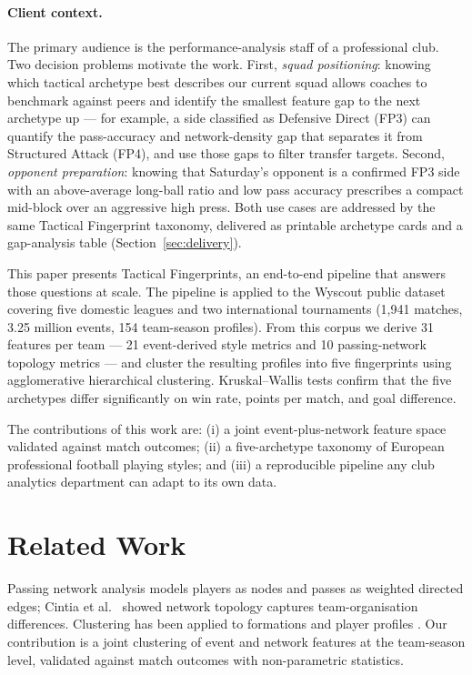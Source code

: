 \documentclass[runningheads]{llncs}
\begin{document}
\paragraph*{Client context.}
The primary audience is the performance-analysis staff of a professional club. Two decision problems motivate the work. First, \textit{squad positioning}: knowing which tactical archetype best describes our current squad allows coaches to benchmark against peers and identify the smallest feature gap to the next archetype up --- for example, a side classified as Defensive Direct (FP3) can quantify the pass-accuracy and network-density gap that separates it from Structured Attack (FP4), and use those gaps to filter transfer targets. Second, \textit{opponent preparation}: knowing that Saturday's opponent is a confirmed FP3 side with an above-average long-ball ratio and low pass accuracy prescribes a compact mid-block over an aggressive high press. Both use cases are addressed by the same Tactical Fingerprint taxonomy, delivered as printable archetype cards and a gap-analysis table (Section~\ref{sec:delivery}).

This paper presents Tactical Fingerprints, an end-to-end pipeline that answers those questions at scale. The pipeline is applied to the Wyscout public dataset covering five domestic leagues and two international tournaments (1,941 matches, 3.25 million events, 154 team-season profiles). From this corpus we derive 31 features per team --- 21 event-derived style metrics and 10 passing-network topology metrics --- and cluster the resulting profiles into five fingerprints using agglomerative hierarchical clustering. Kruskal--Wallis tests confirm that the five archetypes differ significantly on win rate, points per match, and goal difference.

The contributions of this work are: (i) a joint event-plus-network feature space validated against match outcomes; (ii) a five-archetype taxonomy of European professional football playing styles; and (iii) a reproducible pipeline any club analytics department can adapt to its own data.

\section{Related Work}

Passing network analysis \cite{duch2010} models players as nodes and passes as weighted directed edges; Cintia et al.\ \cite{cintia2015} showed network topology captures team-organisation differences. Clustering has been applied to formations \cite{bialkowski2014} and player profiles \cite{pappalardo2019}. Our contribution is a joint clustering of event and network features at the team-season level, validated against match outcomes with non-parametric statistics.
\end{document}
